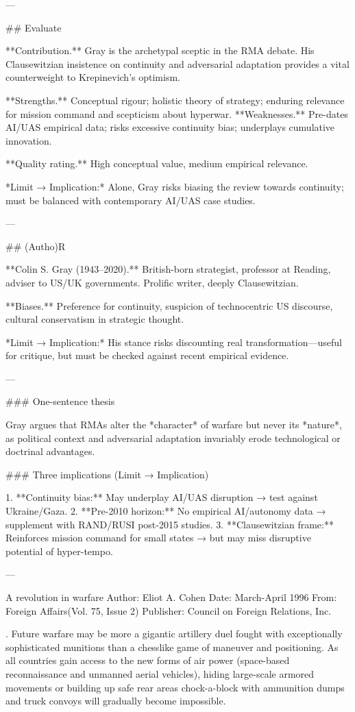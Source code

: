 ---

## Evaluate

**Contribution.** Gray is the archetypal sceptic in the RMA debate. His Clausewitzian insistence on continuity and adversarial adaptation provides a vital counterweight to Krepinevich’s optimism.

**Strengths.** Conceptual rigour; holistic theory of strategy; enduring relevance for mission command and scepticism about hyperwar.
**Weaknesses.** Pre-dates AI/UAS empirical data; risks excessive continuity bias; underplays cumulative innovation.

**Quality rating.** High conceptual value, medium empirical relevance.

*Limit → Implication:* Alone, Gray risks biasing the review towards continuity; must be balanced with contemporary AI/UAS case studies.

---

## (Autho)R

**Colin S. Gray (1943–2020).** British-born strategist, professor at Reading, adviser to US/UK governments. Prolific writer, deeply Clausewitzian.

**Biases.** Preference for continuity, suspicion of technocentric US discourse, cultural conservatism in strategic thought.

*Limit → Implication:* His stance risks discounting real transformation—useful for critique, but must be checked against recent empirical evidence.

---

### One-sentence thesis

Gray argues that RMAs alter the *character* of warfare but never its *nature*, as political context and adversarial adaptation invariably erode technological or doctrinal advantages.

### Three implications (Limit → Implication)

1. **Continuity bias:** May underplay AI/UAS disruption → test against Ukraine/Gaza.
2. **Pre-2010 horizon:** No empirical AI/autonomy data → supplement with RAND/RUSI post-2015 studies.
3. **Clausewitzian frame:** Reinforces mission command for small states → but may miss disruptive potential of hyper-tempo.

---

 A revolution in warfare
Author: Eliot A. Cohen
Date: March-April 1996 
From: Foreign Affairs(Vol. 75, Issue 2)
Publisher: Council on Foreign Relations, Inc.

. Future warfare may be more a gigantic
artillery duel fought with exceptionally sophisticated munitions than a chesslike game of maneuver and positioning. As all countries
gain access to the new forms of air power (space-based reconnaissance and unmanned aerial vehicles), hiding large-scale armored
movements or building up safe rear areas chock-a-block with ammunition dumps and truck convoys will gradually become
impossible. 


